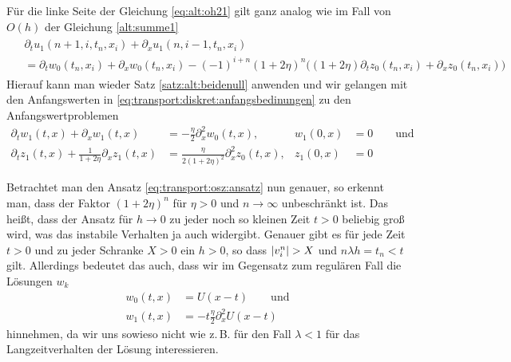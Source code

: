 Für die linke Seite der Gleichung \eqref{eq:alt:oh21} gilt ganz analog wie im Fall von $O(h)$ der Gleichung \eqref{alt:summe1}
\begin{align*}
\begin{split}
&\partial_t u_1(n+1, i, t_n, x_i) + \partial_x u_1(n, i-1, t_n, x_i)\\
&= \partial_t w_0(t_n, x_i) + \partial_x w_0(t_n, x_i) - (-1)^{i+n} (1 + 2\eta)^n \bigl( (1 + 2 \eta) \partial_t z_0(t_n, x_i) + \partial_x z_0(t_n, x_i) \bigr)
\end{split}
\end{align*}
Hierauf kann man wieder Satz \ref{satz:alt:beidenull} anwenden und wir gelangen mit den Anfangswerten in \eqref{eq:transport:diskret:anfangsbedinungen} zu den Anfangswertproblemen
\begin{align}
\partial_t w_1(t, x) + \partial_x w_1(t, x) &= -\frac{\eta}{2}  \partial^2_x w_0(t, x), &w_1(0,x) &= 0 \qquad \text{und}\\
\partial_t z_1(t, x) + \frac{1}{1 + 2 \eta} \partial_x z_1(t, x) &= \frac{\eta}{2 (1 + 2 \eta)^2} \partial^2_x z_0(t, x), &z_1(0,x) &= 0 \label{eq:transport:osz:oh2_B}
\end{align}

Betrachtet man den Ansatz \eqref{eq:transport:osz:ansatz} nun genauer, so erkennt man, dass der Faktor $(1 + 2 \eta)^n$ für $\eta > 0$ und $n \to \infty$ unbeschränkt ist.
Das heißt, dass der Ansatz für $h \to 0$ zu jeder noch so kleinen Zeit $t > 0$ beliebig groß wird, was das instabile Verhalten ja auch widergibt. 
Genauer gibt es für jede Zeit $t > 0$ und zu jeder Schranke $X > 0$ ein $h > 0$, so dass $\left| v^n_i \right| > X$ und $n \lambda h = t_n < t$ gilt.
Allerdings bedeutet das auch, dass wir im Gegensatz zum regulären Fall die Lösungen $w_k$
\begin{align}\label{eq:transport:osz:wk_loesungen}
w_0(t, x) &= U(x - t) \qquad \text{und}\\
w_1(t, x) &= - t \frac{\eta} 2 \partial^2_x U(x - t)
\end{align}
hinnehmen, da wir uns sowieso nicht wie z.\,B. für den Fall $\lambda < 1$ für das Langzeitverhalten der Lösung interessieren.

